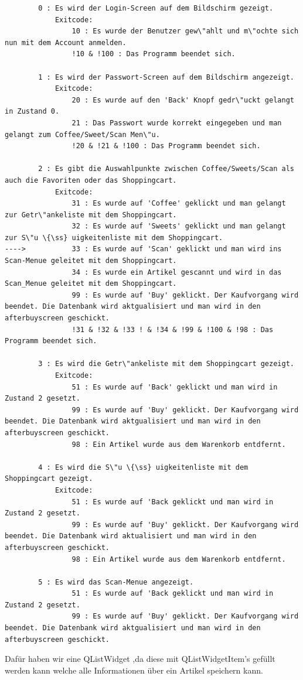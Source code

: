 \documentclass[11pt,a4paper]{article} %
\begin{document}
\begin{lstlisting}
		0 : Es wird der Login-Screen auf dem Bildschirm gezeigt.
			Exitcode: 
				10 : Es wurde der Benutzer gew\"ahlt und m\"ochte sich nun mit dem Account anmelden.
				!10 & !100 : Das Programm beendet sich.
				
		1 : Es wird der Passwort-Screen auf dem Bildschirm angezeigt.
			Exitcode:
				20 : Es wurde auf den 'Back' Knopf gedr\"uckt gelangt in Zustand 0.
				21 : Das Passwort wurde korrekt eingegeben und man gelangt zum Coffee/Sweet/Scan Men\"u.
				!20 & !21 & !100 : Das Programm beendet sich.
				
		2 : Es gibt die Auswahlpunkte zwischen Coffee/Sweets/Scan als auch die Favoriten oder das Shoppingcart.
			Exitcode:
				31 : Es wurde auf 'Coffee' geklickt und man gelangt zur Getr\"ankeliste mit dem Shoppingcart.
				32 : Es wurde auf 'Sweets' geklickt und man gelangt zur S\"u \{\ss} uigkeitenliste mit dem Shoppingcart.
---->        	33 : Es wurde auf 'Scan' geklickt und man wird ins Scan-Menue geleitet mit dem Shoppingcart.
				34 : Es wurde ein Artikel gescannt und wird in das Scan_Menue geleitet mit dem Shoppingcart.
				99 : Es wurde auf 'Buy' geklickt. Der Kaufvorgang wird beendet. Die Datenbank wird aktgualisiert und man wird in den afterbuyscreen geschickt.
				!31 & !32 & !33 ! & !34 & !99 & !100 & !98 : Das Programm beendet sich.
				
		3 : Es wird die Getr\"ankeliste mit dem Shoppingcart gezeigt.
			Exitcode:
				51 : Es wurde auf 'Back' geklickt und man wird in Zustand 2 gesetzt.
				99 : Es wurde auf 'Buy' geklickt. Der Kaufvorgang wird beendet. Die Datenbank wird aktgualisiert und man wird in den afterbuyscreen geschickt.
				98 : Ein Artikel wurde aus dem Warenkorb entdfernt.
				
		4 : Es wird die S\"u \{\ss} uigkeitenliste mit dem Shoppingcart gezeigt. 
			Exitcode:
				51 : Es wurde auf 'Back geklickt und man wird in Zustand 2 gesetzt.
				99 : Es wurde auf 'Buy' geklickt. Der Kaufvorgang wird beendet. Die Datenbank wird aktualisiert und man wird in den afterbuyscreen geschickt.
				98 : Ein Artikel wurde aus dem Warenkorb entdfernt.
			
		5 : Es wird das Scan-Menue angezeigt.
				51 : Es wurde auf 'Back geklickt und man wird in Zustand 2 gesetzt.
				99 : Es wurde auf 'Buy' geklickt. Der Kaufvorgang wird beendet. Die Datenbank wird aktgualisiert und man wird in den afterbuyscreen geschickt.
\end{lstlisting}	
Dafür haben wir eine QListWidget ,da diese mit QListWidgetItem's gefüllt werden kann welche alle Informationen über ein Artikel speichern kann.
\end{document}
